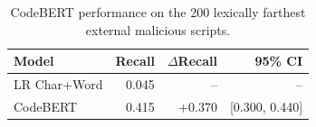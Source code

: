 \begin{table}[t]
\centering
\caption{CodeBERT performance on the 200 lexically farthest external malicious scripts.}
\label{tab:q1_codebert}
\small
\begin{tabular}{lrrr}
\toprule
Model & Recall & $\Delta$Recall & 95\% CI \\
\midrule
LR Char+Word & 0.045 & -- & -- \\
CodeBERT & 0.415 & +0.370 & [0.300, 0.440] \\
\bottomrule
\end{tabular}
\end{table}
